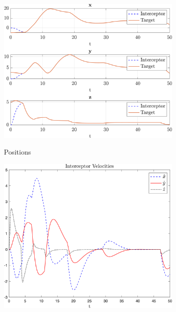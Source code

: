 \documentclass{article}
\begin{document}
\begin{multicols}{2}
\begin{figure}[H]
\centering
\begin{subfigure}[b]{0.49\columnwidth}
    \centering
    \includegraphics[width = 1\textwidth]{images/PosnRandom.png}
     \label{fig:PosRand}
     \vspace{-5mm}
     \caption{Positions}
\end{subfigure}
\begin{subfigure}[b]{0.49\columnwidth}
    \centering
    \includegraphics[width = 1\textwidth]{images/VelocityRandom.png}
     \label{fig:VRandom}

\end{subfigure}
\end{figure}
\end{multicols}
\end{document}
